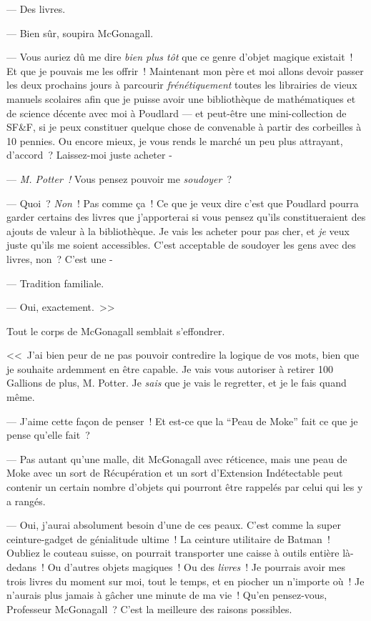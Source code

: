 --- Des livres.

--- Bien sûr, soupira McGonagall.

--- Vous auriez dû me dire \emph{bien plus tôt} que ce genre d'objet magique existait~! Et que je pouvais me les offrir~! Maintenant mon père et moi allons devoir passer les deux prochains jours à parcourir \emph{frénétiquement} toutes les librairies de vieux manuels scolaires afin que je puisse avoir une bibliothèque de mathématiques et de science décente avec moi à Poudlard — et peut-être une mini-collection de SF\&F, si je peux constituer quelque chose de convenable à partir des corbeilles à 10 pennies. Ou encore mieux, je vous rends le marché un peu plus attrayant, d'accord~? Laissez-moi juste acheter -

--- \emph{M. Potter~!} Vous pensez pouvoir me \emph{soudoyer}~?

--- Quoi~? \emph{Non}~! Pas comme ça~! Ce que je veux dire c'est que Poudlard pourra garder certains des livres que j'apporterai si vous pensez qu'ils constitueraient des ajouts de valeur à la bibliothèque. Je vais les acheter pour pas cher, et \emph{je} veux juste qu'ils me soient accessibles. C'est acceptable de soudoyer les gens avec des livres, non~? C'est une -

--- Tradition familiale.

--- Oui, exactement.~>>

Tout le corps de McGonagall semblait s'effondrer.

<<~J'ai bien peur de ne pas pouvoir contredire la logique de vos mots, bien que je souhaite ardemment en être capable. Je vais vous autoriser à retirer 100 Gallions de plus, M. Potter. Je \emph{sais} que je vais le regretter, et je le fais quand même.

--- J'aime cette façon de penser~! Et est-ce que la “Peau de Moke” fait ce que je pense qu'elle fait~?

--- Pas autant qu'une malle, dit McGonagall avec réticence, mais une peau de Moke avec un sort de Récupération et un sort d'Extension Indétectable peut contenir un certain nombre d'objets qui pourront être rappelés par celui qui les y a rangés.

--- Oui, j'aurai absolument besoin d'une de ces peaux. C'est comme la super ceinture-gadget de génialitude ultime~! La ceinture utilitaire de Batman~! Oubliez le couteau suisse, on pourrait transporter une caisse à outils entière là-dedans~! Ou d'autres objets magiques~! Ou des \emph{livres}~! Je pourrais avoir mes trois livres du moment sur moi, tout le temps, et en piocher un n'importe où~! Je n'aurais plus jamais à gâcher une minute de ma vie~! Qu'en pensez-vous, Professeur McGonagall~? C'est la meilleure des raisons possibles.


